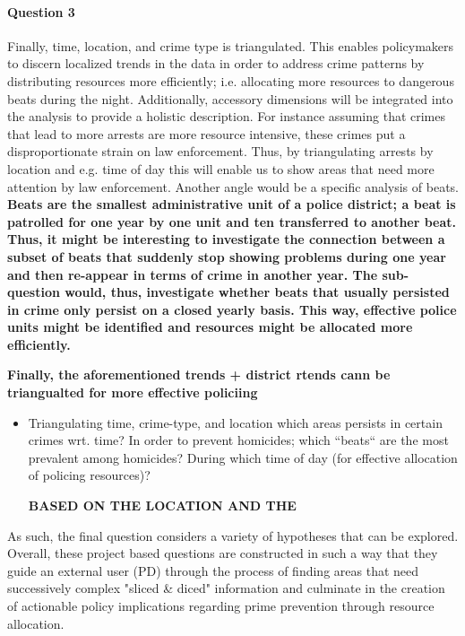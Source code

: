 \documentclass[a4paper]{article}
\begin{document}
\paragraph{Question 3} Finally, time, location, and crime type is triangulated. This enables policymakers to discern localized trends in the data in order to address crime patterns by distributing resources more efficiently; i.e. allocating more resources to dangerous beats during the night. Additionally, accessory dimensions will be integrated into the analysis to provide a holistic description. For instance assuming that crimes that lead to more arrests are more resource intensive, these crimes put a disproportionate strain on law enforcement. Thus, by triangulating arrests by location and e.g. time of day this will enable us to show areas that need more attention by law enforcement. Another angle would be a specific analysis of beats. \textbf{Beats are the smallest administrative unit of a police district; a beat is patrolled for one year by one unit and ten transferred to another beat. Thus, it might be interesting to investigate the connection between a subset of beats that suddenly stop showing problems during one year and then re-appear in terms of crime in another year. The sub-question would, thus, investigate whether beats that usually persisted in crime only persist on a closed yearly basis. This way, effective police units might be identified and resources might be allocated more efficiently.}
 
 \textbf{Finally, the aforementioned trends + district rtends cann be triangualted for more effective policiing}
 
 
\begin{itemize}
  \item Triangulating time, crime-type, and location which areas persists in certain crimes wrt. time?
In order to prevent homicides; which “beats“ are the most prevalent among homicides? During which time of day (for effective allocation of policing resources)? 

\textbf{BASED ON THE LOCATION AND THE }
\end{itemize}

As such, the final question considers a variety of hypotheses that can be explored. Overall, these project based questions are constructed in such a way that they guide an external user (PD) through the process of finding areas that need successively complex "sliced \& diced" information and culminate in the creation of actionable policy implications regarding prime prevention through resource allocation.
\end{document}
